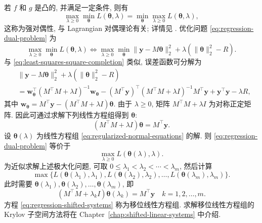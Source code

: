 {若 $f$ 和 $g$ 是凸的, 并满足一定条件, 则有}
\[\max_{\lambda\ge0}\min_{\boldsymbol{\theta}}L(\boldsymbol{\theta},\lambda)=\min_{\boldsymbol{\theta}}\max_{\lambda\ge0}L(\boldsymbol{\theta},\lambda),\]
{这称为强对偶性, 与 Lagrangian 对偶理论有关; 详情见 . 优化问题 \eqref{eq:regression-dual-problem} 为}
\begin{equation}\label{eq:regularized-regression-dual}
\max_{\lambda\ge0}\min_{\boldsymbol{\theta}}L(\boldsymbol{\theta},\lambda)\Leftrightarrow
\max_{\lambda\ge0}\min_{\boldsymbol{\theta}}\|\boldsymbol{y}-M\boldsymbol{\theta}\|_2^2+\lambda(\|\boldsymbol{\theta}\|_2^2-R).
\end{equation}
{与 \eqref{eq:least-squares-square-completion} 类似, 误差函数可分解为}
\[\begin{aligned}
&\|\boldsymbol{y}-M\boldsymbol{\theta}\|_2^2+\lambda(\|\boldsymbol{\theta}\|_2^2-R)\\
&=\boldsymbol{w}_{\boldsymbol{\theta}}^{\top}(M^{\top}M+\lambda I)^{-1}\boldsymbol{w}_{\boldsymbol{\theta}}-(M^{\top}\boldsymbol{y})^{\top}(M^{\top}M+\lambda I)^{-1}M^{\top}\boldsymbol{y}+\boldsymbol{y}^{\top}\boldsymbol{y}-\lambda R,
\end{aligned}\]
{其中 $\boldsymbol{w}_{\boldsymbol{\theta}}=M^{\top}\boldsymbol{y}-(M^{\top}M+\lambda I)\boldsymbol{\theta}$. 由于 $\lambda\ge0$, 矩阵 $M^{\top}M+\lambda I$ 为对称正定矩阵. 因此可通过求解下列线性方程组得到 $\boldsymbol{\theta}$:}
\begin{equation}\label{eq:regularized-normal-equations}
(M^{\top}M+\lambda I)\boldsymbol{\theta}=M^{\top}\boldsymbol{y}.
\end{equation}
{设 $\boldsymbol{\theta}(\lambda)$ 为线性方程组 \eqref{eq:regularized-normal-equations} 的解. 则 \eqref{eq:regression-dual-problem} 等价于}
\[\max_{\lambda\ge0}L(\boldsymbol{\theta}(\lambda),\lambda).\]
{为近似求解上述极大化问题, 可取 $0\le\lambda_1<\lambda_2<\cdots<\lambda_m$, 然后计算}
\[\max\{L(\boldsymbol{\theta}(\lambda_1),\lambda_1),L(\boldsymbol{\theta}(\lambda_2),\lambda_2),\ldots,L(\boldsymbol{\theta}(\lambda_m),\lambda_m)\}.\]
{此时需要 $\boldsymbol{\theta}(\lambda_1),\boldsymbol{\theta}(\lambda_2),\ldots,\boldsymbol{\theta}(\lambda_m)$, 即}
\begin{equation}\label{eq:regression-shifted-systems}
(M^{\top}M+\lambda_k I)\boldsymbol{\theta}(\lambda_k)=M^{\top}\boldsymbol{y}\quad k=1,2,\ldots,m.
\end{equation}
{方程 \eqref{eq:regression-shifted-systems} 称为移位线性方程组. 求解移位线性方程组的 Krylov 子空间方法将在 Chapter\ \ref{chap:shifted-linear-systems} 中介绍.}
